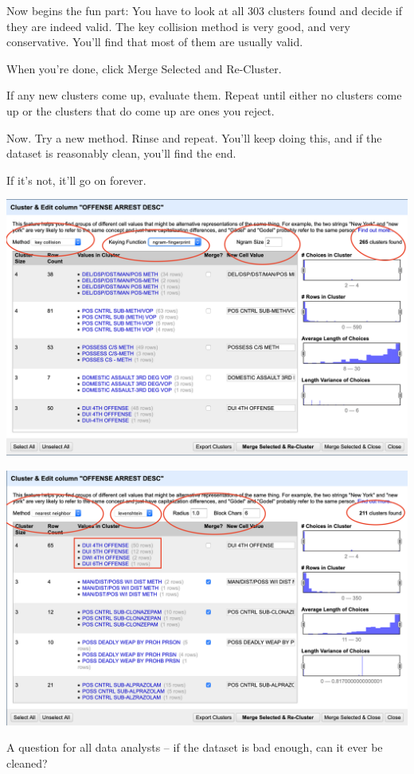 \documentclass[]{book}
\begin{document}
Now begins the fun part: You have to look at all 303 clusters found and decide if they are indeed valid. The key collision method is very good, and very conservative. You'll find that most of them are usually valid.

When you're done, click Merge Selected and Re-Cluster.

If any new clusters come up, evaluate them. Repeat until either no clusters come up or the clusters that do come up are ones you reject.

Now. Try a new method. Rinse and repeat. You'll keep doing this, and if the dataset is reasonably clean, you'll find the end.

If it's not, it'll go on forever.

\includegraphics[width=27.75in]{images/open7}

\includegraphics[width=27.81in]{images/open8}

A question for all data analysts -- if the dataset is bad enough, can it ever be cleaned?
\end{document}
